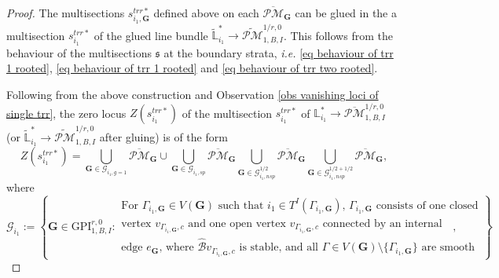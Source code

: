\documentclass[11pt]{amsart}
\theoremstyle{definition}
\theoremstyle{remark}
\newcommand{\oPMb}{{\overline{\mathcal{PM}}}}
\newcommand{\nontilde}{}
\newcommand{\<}{\left<}
\renewcommand{\>}{\right>}
\numberwithin{equation}{section}
\def\GPI{{\text{GPI}}}
\begin{document}
\begin{proof}
        The multisections $\nontilde{s}^{trr*}_{i_1,\mathbf{G}}$ defined above on each $\oPMb_{\mathbf{G}}$ can be glued in the a multisection $\nontilde{s}^{trr*}_{i_1}$ of the glued line bundle $\widetilde{\mathbb L}^*_{i_1}\to \widetilde{\mathcal{PM}}^{1/r,0}_{1,B,I}$. This follows from the behaviour of the multisections $\mathfrak s$ at the boundary strata, \textit{i.e.} \eqref{eq behaviour of trr 1 rooted}, \eqref{eq behaviour of trr 1 rooted} and \eqref{eq behaviour of trr two rooted}.

    
        Following from the above construction and Observation \ref{obs vanishing loci of single trr}, the zero locus $Z(\nontilde{s}^{trr*}_{i_1})$ of the multisection $\nontilde{s}^{trr*}_{i_1}$ of ${\mathbb L}^*_{i_1}\to \oPMb^{1/r,0}_{1,B,I}$ (or $\widetilde{\mathbb L}^*_{i_1}\to \widetilde{\mathcal{PM}}^{1/r,0}_{1,B,I}$ after gluing) is of the form
        \begin{equation} \label{eq of a single global trr of Lstar}
        Z(\nontilde{s}^{trr*}_{i_1})=\bigcup_{\bm{G}\in \bm{\mathcal G}_{i_1,g=1} } \oPMb_{\bm{G}} \cup \bigcup_{\bm{G}\in  \bm{\mathcal G}_{i_1,sp} } \oPMb_{\bm{G}} \bigcup_{\bm{G}\in  \bm{\mathcal G}^{1/2}_{i_1,nsp} } \oPMb_{\bm{G}} \bigcup_{\bm{G}\in \bm{\mathcal G}^{1/2+1/2}_{i_1,nsp}} \oPMb_{\bm{G}},
        \end{equation}
where 
        \begin{equation*}
             \bm{\mathcal G}_{i_1}:=\left\{ \bm{G}\in \GPI_{1,B,I}^{r,0} \colon  \begin{array}{ccc} \text{For   $\Gamma_{i_1,\bm{G}}\in V(\bm{G})$  such that  $i_1\in T^I(\Gamma_{i_1,\bm{G}})$, $\Gamma_{i_1,\bm{G}}$ consists of one closed}\\ \text{vertex $v_{\Gamma_{i_1,\bm{G}},c}$ and one open vertex $v_{\Gamma_{i_1,\bm{G}},c}$ connected by an internal}
             \\ \text{edge $e_{\bm{G}}$, where $\hat{\mathcal B} v_{\Gamma_{i_1,\bm{G}},c}$ is stable, and all $\Gamma\in V(\bm{G})\setminus\{\Gamma_{i_1,\bm{G}}\}$ are smooth}
             \end{array}\right\},
        \end{equation*}
        \begin{equation*}

\end{equation*}
\end{proof}
\end{document}
